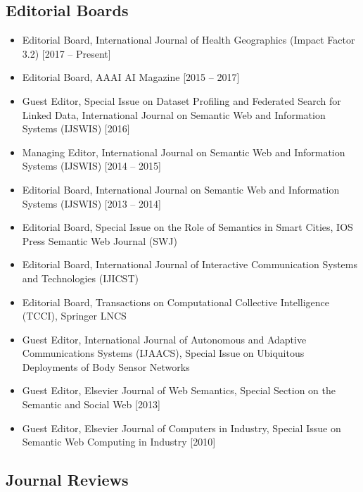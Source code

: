 \documentclass[10pt,a4paper]{res} %
\begin{document}
\begin{resume}
\subsection*{Editorial Boards}
\begin{itemize} \itemsep -2pt
\item Editorial Board, International Journal of Health Geographics (Impact Factor 3.2) [2017 -- Present]
\item Editorial Board, AAAI AI Magazine [2015 -- 2017]
\item Guest Editor, Special Issue on Dataset Profiling and Federated Search for Linked Data, International Journal on Semantic Web and Information Systems (IJSWIS) [2016]
\item Managing Editor, International Journal on Semantic Web and Information Systems (IJSWIS) [2014 -- 2015]
\item Editorial Board, International Journal on Semantic Web and Information Systems (IJSWIS) [2013 -- 2014]
\item Editorial Board, Special Issue on the Role of Semantics in Smart Cities, IOS Press Semantic Web Journal (SWJ) %
\item Editorial Board, International Journal of Interactive Communication Systems and Technologies (IJICST) %
\item Editorial Board, Transactions on Computational Collective Intelligence (TCCI), Springer LNCS %
\item Guest Editor, International Journal of Autonomous and Adaptive Communications Systems (IJAACS), Special Issue on Ubiquitous Deployments of Body Sensor Networks %
\item Guest Editor, Elsevier Journal of Web Semantics, Special Section on the Semantic and Social Web [2013]
\item Guest Editor, Elsevier Journal of Computers in Industry, Special Issue on Semantic Web Computing in Industry [2010]
\end{itemize}

\subsection*{Journal Reviews}


\end{resume}
\end{document}
